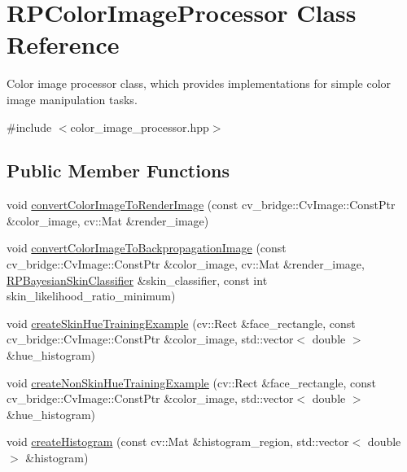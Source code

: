 \hypertarget{class_r_p_color_image_processor}{\section{\-R\-P\-Color\-Image\-Processor \-Class \-Reference}
\label{class_r_p_color_image_processor}
}


\-Color image processor class, which provides implementations for simple color image manipulation tasks.  




{\ttfamily \#include $<$color\-\_\-image\-\_\-processor.\-hpp$>$}

\subsection*{\-Public \-Member \-Functions}
\begin{DoxyCompactItemize}
\item 
void \hyperlink{class_r_p_color_image_processor_accdef8184c373b30dd97e7fb4aea91b9}{convert\-Color\-Image\-To\-Render\-Image} (const cv\-\_\-bridge\-::\-Cv\-Image\-::\-Const\-Ptr \&color\-\_\-image, cv\-::\-Mat \&render\-\_\-image)
\item 
void \hyperlink{class_r_p_color_image_processor_ac2571f36fd53d8725a60a311a4124430}{convert\-Color\-Image\-To\-Backpropagation\-Image} (const cv\-\_\-bridge\-::\-Cv\-Image\-::\-Const\-Ptr \&color\-\_\-image, cv\-::\-Mat \&render\-\_\-image, \hyperlink{class_r_p_bayesian_skin_classifier}{\-R\-P\-Bayesian\-Skin\-Classifier} \&skin\-\_\-classifier, const int skin\-\_\-likelihood\-\_\-ratio\-\_\-minimum)
\item 
void \hyperlink{class_r_p_color_image_processor_a1766a497e20c8e375a3c89ff3b259155}{create\-Skin\-Hue\-Training\-Example} (cv\-::\-Rect \&face\-\_\-rectangle, const cv\-\_\-bridge\-::\-Cv\-Image\-::\-Const\-Ptr \&color\-\_\-image, std\-::vector$<$ double $>$ \&hue\-\_\-histogram)
\item 
void \hyperlink{class_r_p_color_image_processor_a4f59934cb9fb920b76a621ebe94333c8}{create\-Non\-Skin\-Hue\-Training\-Example} (cv\-::\-Rect \&face\-\_\-rectangle, const cv\-\_\-bridge\-::\-Cv\-Image\-::\-Const\-Ptr \&color\-\_\-image, std\-::vector$<$ double $>$ \&hue\-\_\-histogram)
\item 
void \hyperlink{class_r_p_color_image_processor_a137e06bfcf21db64a099c0c74086c7ee}{create\-Histogram} (const cv\-::\-Mat \&histogram\-\_\-region, std\-::vector$<$ double $>$ \&histogram)
\end{DoxyCompactItemize}


